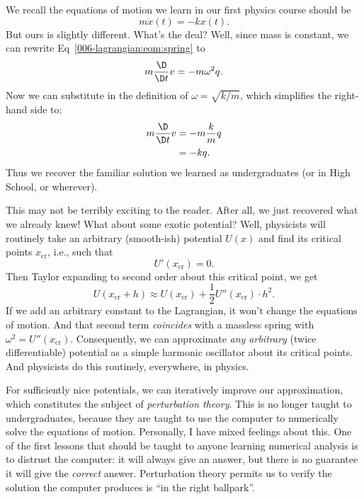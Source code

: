 We recall the equations of motion we learn in our first physics course
should be
\begin{equation}
m\ddot{x}(t) = -kx(t).
\end{equation}
But ours is slightly different. What's the deal? Well, since mass is
constant, we can rewrite Eq~\eqref{006-lagrangian:eom:spring} to
\begin{equation}
m\frac{\D}{\D t}v = - m\omega^{2}q.
\end{equation}
Now we can substitute in the definition of $\omega=\sqrt{k/m}$, which
simplifies the right-hand side to:
\begin{equation}
\begin{split}
m\frac{\D}{\D t}v &= - m\frac{k}{m}q\\
&= -kq.
\end{split}
\end{equation}
Thus we recover the familiar solution we learned as undergraduates (or
in High School, or wherever).

\begin{remark}
This may not be terribly exciting to the reader. After all, we just
recovered what we already knew! What about some exotic potential? Well,
physicists will routinely take an arbitrary (smooth-ish) potential
$U(x)$ and find its critical points $x_{\text{cr}}$, i.e., such that
\begin{equation}
U'(x_{\text{cr}})=0.
\end{equation}
Then Taylor expanding to second order about this critical point, we get
\begin{equation}
U(x_{\text{cr}}+h)\approx U(x_{\text{cr}})
+ \frac{1}{2}U''(x_{\text{cr}})\cdot h^{2}.
\end{equation}
If we add an arbitrary constant to the Lagrangian, it won't change the
equations of motion. And that second term \emph{coincides} with a
massless spring with $\omega^{2} = U''(x_{\text{cr}})$. Consequently, we
can approximate \emph{any arbitrary} (twice differentiable) potential as
a simple harmonic oscillator about its critical points. And physicists
do this routinely, everywhere, in physics.

For sufficiently nice potentials, we can iteratively improve our
approximation, which constitutes the subject of \emph{perturbation theory}.
This is no longer taught to undergraduates, because they are taught to
use the computer to numerically solve the equations of
motion. Personally, I have mixed feelings about this. One of the first
lessons that should be taught to anyone learning numerical analysis is
to distrust the computer: it will always give an answer, but there is no
guarantee it will give the \emph{correct} answer. Perturbation theory
permits us to verify the solution the computer produces is ``in the
right ballpark''.
\end{remark}

